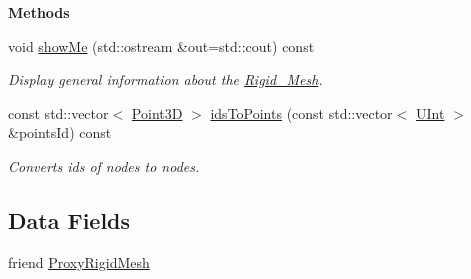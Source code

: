 \begin{Indent}{\bf Methods}\par
\begin{DoxyCompactItemize}
\item 
void \hyperlink{classFVCode3D_1_1Rigid__Mesh_a41b79ff22b6d03329967d1ffbe463679}{show\+Me} (std\+::ostream \&out=std\+::cout) const 
\begin{DoxyCompactList}\small\item\em Display general information about the \hyperlink{classFVCode3D_1_1Rigid__Mesh}{Rigid\+\_\+\+Mesh}. \end{DoxyCompactList}\item 
const std\+::vector$<$ \hyperlink{classFVCode3D_1_1Point3D}{Point3D} $>$ \hyperlink{classFVCode3D_1_1Rigid__Mesh_a38343c767d9f33e3b8affcfb9b17663d}{ids\+To\+Points} (const std\+::vector$<$ \hyperlink{namespaceFVCode3D_a4bf7e328c75d0fd504050d040ebe9eda}{U\+Int} $>$ \&points\+Id) const 
\begin{DoxyCompactList}\small\item\em Converts ids of nodes to nodes. \end{DoxyCompactList}\end{DoxyCompactItemize}
\end{Indent}
\subsection*{Data Fields}
\begin{DoxyCompactItemize}
\item 
friend \hyperlink{classFVCode3D_1_1Rigid__Mesh_aae8669ab0591db87f71f855bbfd74c09}{Proxy\+Rigid\+Mesh}
\end{DoxyCompactItemize}
